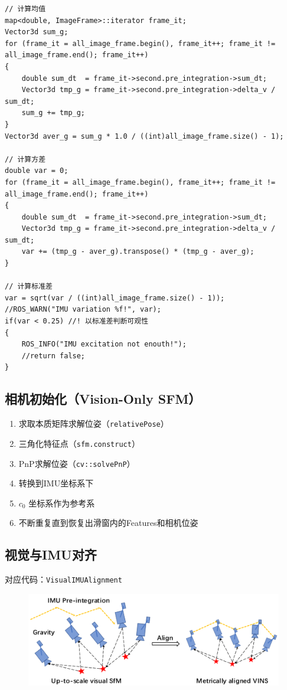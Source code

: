 \documentclass[12pt,a4paper]{article}
\begin{document}
\begin{lstlisting}
// 计算均值
map<double, ImageFrame>::iterator frame_it;
Vector3d sum_g;
for (frame_it = all_image_frame.begin(), frame_it++; frame_it != all_image_frame.end(); frame_it++)
{
    double sum_dt  = frame_it->second.pre_integration->sum_dt;
    Vector3d tmp_g = frame_it->second.pre_integration->delta_v / sum_dt;
    sum_g += tmp_g;
}
Vector3d aver_g = sum_g * 1.0 / ((int)all_image_frame.size() - 1);

// 计算方差
double var = 0;
for (frame_it = all_image_frame.begin(), frame_it++; frame_it != all_image_frame.end(); frame_it++)
{
    double sum_dt  = frame_it->second.pre_integration->sum_dt;
    Vector3d tmp_g = frame_it->second.pre_integration->delta_v / sum_dt;
    var += (tmp_g - aver_g).transpose() * (tmp_g - aver_g);
}

// 计算标准差
var = sqrt(var / ((int)all_image_frame.size() - 1));
//ROS_WARN("IMU variation %f!", var);
if(var < 0.25) //! 以标准差判断可观性
{
    ROS_INFO("IMU excitation not enouth!");
    //return false;
}
\end{lstlisting}

\subsection{相机初始化（Vision-Only SFM）}

\begin{enumerate}
\item 求取本质矩阵求解位姿（\verb|relativePose|）
\item  三角化特征点（\verb|sfm.construct|）
\item  PnP求解位姿（\verb|cv::solvePnP|）
\item  转换到IMU坐标系下
\item  $c_0$ 坐标系作为参考系
\item  不断重复直到恢复出滑窗内的Features和相机位姿
\end{enumerate}

\subsection{视觉与IMU对齐}

对应代码：\verb|VisualIMUAlignment|

\begin{figure}[htbp]
\centering
\includegraphics[scale=0.6]{images/visual_inertial_alignment.png}
\end{figure}
\end{document}
